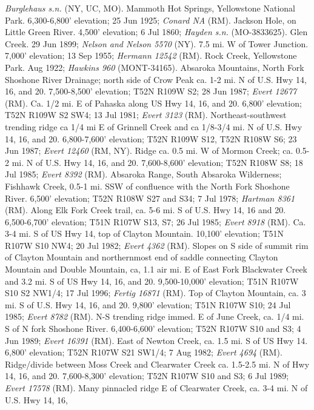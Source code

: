\textit{Burglehaus s.n.} (NY, UC, MO).
Mammoth Hot Springs, Yellowstone National Park. 6,300-6,800' elevation;
25 Jun 1925; \textit{Conard NA} (RM).
Jackson Hole, on Little Green River. 4,500' elevation; 6 Jul 1860;
\textit{Hayden s.n.} (MO-3833625).
Glen Creek. 29 Jun 1899; \textit{Nelson and Nelson 5570} (NY).
7.5 mi. W of Tower Junction. 7,000' elevation; 13 Sep 1955;
\textit{Hermann 12542} (RM).
Rock Creek, Yellowstone Park. Aug 1922; \textit{Hawkins 960} (MONT-34165).
Absaroka Mountains, North Fork Shoshone River Drainage; north side of Crow Peak
ca. 1-2 mi. N of U.S. Hwy 14, 16, and 20. 7,500-8,500’ elevation; T52N R109W S2;
28 Jun 1987; \textit{Evert 12677} (RM).
Ca. 1/2 mi. E of Pahaska along US Hwy 14, 16, and 20. 6,800’ elevation;
T52N R109W S2 SW4; 13 Jul 1981; \textit{Evert 3123} (RM).
Northeast-southwest trending ridge ca 1/4 mi E of Grinnell Creek and ca 1/8-3/4
mi. N of U.S. Hwy 14, 16, and 20. 6,800-7,600’ elevation; T52N R109W S12,
T52N R108W S6; 23 Jun 1987; \textit{Evert 12460} (RM, NY).
Ridge ca. 0.5 mi. W of Mormon Creek; ca. 0.5-2 mi. N of U.S. Hwy 14, 16, and 20.
7,600-8,600’ elevation; T52N R108W S8; 18 Jul 1985; \textit{Evert 8392} (RM).
Absaroka Range, South Absaroka Wilderness; Fishhawk Creek, 0.5-1 mi. SSW of
confluence with the North Fork Shoshone River. 6,500’ elevation;
T52N R108W S27 and S34; 7 Jul 1978; \textit{Hartman 8361} (RM).
Along Elk Fork Creek trail, ca. 5-6 mi. S of U.S. Hwy 14, 16 and 20.
6,500-6,700’ elevation; T51N R107W S13, S7; 26 Jul 1985;
\textit{Evert 8918} (RM).
Ca. 3-4 mi. S of US Hwy 14, top of Clayton Mountain. 10,100’ elevation;
T51N R107W S10 NW4; 20 Jul 1982; \textit{Evert 4362} (RM).
Slopes on S side of summit rim of Clayton Mountain and northernmost end of
saddle connecting Clayton Mountain and Double Mountain, ca, 1.1 air mi. E of
East Fork Blackwater Creek and 3.2 mi. S of US Hwy 14, 16, and 20. 9,500-10,000’
elevation; T51N R107W S10 S2 NW1/4; 17 Jul 1996; \textit{Fertig 16871} (RM).
Top of Clayton Mountain, ca. 3 mi. S of U.S. Hwy 14, 16, and 20. 9,800’
elevation; T51N R107W S10; 24 Jul 1985; \textit{Evert 8782} (RM).
N-S trending ridge immed. E of June Creek, ca. 1/4 mi. S of N fork Shoshone
River. 6,400-6,600’ elevation; T52N R107W S10 and S3; 4 Jun 1989;
\textit{Evert 16391} (RM).
East of Newton Creek, ca. 1.5 mi. S of US Hwy 14. 6,800’ elevation; T52N R107W
S21 SW1/4; 7 Aug 1982; \textit{Evert 4694} (RM).
Ridge/divide between Moss Creek and Clearwater Creek ca. 1.5-2.5 mi. N of Hwy
14, 16, and 20. 7,600-8,300’ elevation; T52N R107W S10 and S3; 6 Jul 1989;
\textit{Evert 17578} (RM).
Many pinnacled ridge E of Clearwater Creek, ca. 3-4 mi. N of U.S. Hwy 14, 16,
